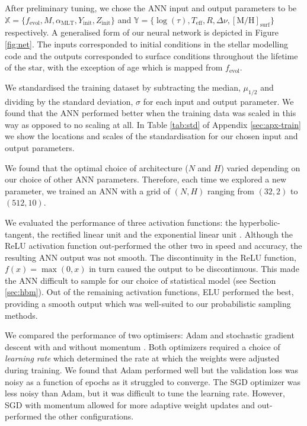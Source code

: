 \documentclass[fleqn,usenatbib]{mnras}
\newcommand{\dnu}{\ensuremath{\Delta\nu}}
\newcommand{\metallicity}{\ensuremath{[\mathrm{M}/\mathrm{H}]}}
\newcommand{\teff}{\ensuremath{T_\mathrm{eff}}}
\newcommand{\mlt}{\ensuremath{{\alpha_\mathrm{MLT}}}}
\begin{document}
After preliminary tuning, we chose the ANN input and output parameters to be $\boldsymbol{\mathbb{X}} = \{f_\mathrm{evol}, M, \mlt, Y_\mathrm{init}, Z_\mathrm{init}\}$ and $\boldsymbol{\mathbb{Y}} = \{\log(\tau), \teff, R, \dnu, \metallicity_\mathrm{surf}\}$ respectively. A generalised form of our neural network is depicted in Figure \ref{fig:net}. The inputs corresponded to initial conditions in the stellar modelling code and the outputs corresponded to surface conditions throughout the lifetime of the star, with the exception of age which is mapped from $f_\mathrm{evol}$.

We standardised the training dataset by subtracting the median, $\mu_{1/2}$ and dividing by the standard deviation, $\sigma$ for each input and output parameter. We found that the ANN performed better when the training data was scaled in this way as opposed to no scaling at all. In Table \ref{tab:std} of Appendix \ref{sec:apx-train} we show the locations and scales of the standardisation for our chosen input and output parameters.

We found that the optimal choice of architecture ($N$ and $H$) varied depending on our choice of other ANN parameters. Therefore, each time we explored a new parameter, we trained an ANN with a grid of $(N,H)$ ranging from $(32, 2)$ to $(512, 10)$.

We evaluated the performance of three activation functions: the hyperbolic-tangent, the rectified linear unit \citep[ReLU;][]{Hahnloser.Sarpeshkar.ea2000, Glorot.Bordes.ea2011} and the exponential linear unit \citep[ELU;][]{Clevert.Unterthiner.ea2015}. Although the ReLU activation function out-performed the other two in speed and accuracy, the resulting ANN output was not smooth. The discontinuity in the ReLU function, $f(x) = \max(0, x)$ in turn caused the output to be discontinuous. This made the ANN difficult to sample for our choice of statistical model (see Section \ref{sec:hbm}). Out of the remaining activation functions, ELU performed the best, providing a smooth output which was well-suited to our probabilistic sampling methods.

We compared the performance of two optimisers: Adam \citep{Kingma.Ba2014} and stochastic gradient descent \citep[SGD; see e.g.][]{Ruder2016} with and without momentum \citep{Qian1999}. Both optimizers required a choice of \emph{learning rate} which determined the rate at which the weights were adjusted during training. We found that Adam performed well but the validation loss was noisy as a function of epochs as it struggled to converge. The SGD optimizer was less noisy than Adam, but it was difficult to tune the learning rate. However, SGD with momentum allowed for more adaptive weight updates and out-performed the other configurations.
\end{document}
